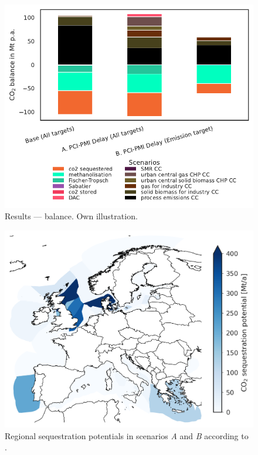 \documentclass[final,5p,times,twocolumn]{elsarticle}
\let\autocite\cite
\begin{document}
\begin{figure}[h]
  \centering
  \includegraphics[width=0.9\linewidth]{co2_balance}
  \caption{Results ---  balance. Own illustration.}
  \label{fig:co2_balance}
\end{figure}

\begin{figure}[h]
  \centering
  \includegraphics[width=0.9\linewidth]{sequestration_map}
  \caption{Regional sequestration potentials in scenarios \textit{A} and \textit{B} according to \autocite{hofmannH2CO2Network2024}.}
  \label{fig:sequestration_map}
\end{figure}
\end{document}
